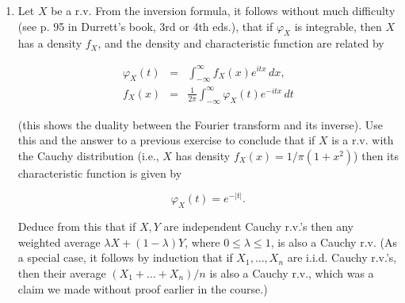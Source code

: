 \documentclass[11pt]{report}
\newcommand{\R}{\mathbb{R}}
\theoremstyle{plain}
\theoremstyle{definition}
\begin{document}
\begin{enumerate}[label=\arabic*.]
$\textbf{(b)}$ Let $X$ be a uniform r.v. in $(0,1)$,
and let $Y_1, Y_2, \ldots$ be the (random) bits in
its binary expansion, i.e. each $Y_n$ is either 0 or
1, and the equation

\begin{equation*}
\tag{39}\label{eq:binaryexp}
X = \sum_{n=1}^\infty \frac{Y_n}{2^n}
\end{equation*}

holds. Show that $Y_1, Y_2, \ldots$ are i.i.d.
unbiased coin tosses (i.e., taking values $0,1$ with
probabilities $1/2,1/2$).

$\textbf{(c)}$ Compute the characteristic function
$\varphi_Z$ of $Z=2X-1$ (which is uniform in
$(-1,1)$). Use (\ref{eq:binaryexp}) to represent this in
terms of the characteristic functions of the $Y_n$'s
(note that the series (\ref{eq:binaryexp}) converges
absolutely, so here there is no need to worry about
almost sure convergence). Deduce the infinite product
identity

\begin{equation*}
\tag{40}\label{eq:infproduct}
\frac{\sin(t)}{t} = \prod_{n=1}^\infty \cos\left(\frac{t}{2^n} \right), \qquad (t\in \R).
\end{equation*}

$\textbf{(d)}$ Substitute $t=\pi/2$ in
(\ref{eq:infproduct}) to get the identity

\[
\frac{2}{\pi} = \frac{\sqrt{2}}{2}\cdot \frac{\sqrt{2+\sqrt{2}}}{2} \cdot \frac{\sqrt{2+\sqrt{2+\sqrt{2}}}}{2} \cdot \ldots
\]

\item Let $X$ be a r.v. From the inversion formula, it
follows without much difficulty (see p. 95 in
Durrett's book, 3rd or 4th eds.), that if $\varphi_X$
is integrable, then $X$ has a density $f_X$, and the
density and characteristic function are related by

\begin{eqnarray*} \varphi_X(t) &=& \int_{-\infty}^\infty f_X(x) e^{itx}\,dx,  \\
f_X(x) &=& \frac{1}{2\pi} \int_{-\infty}^\infty \varphi_X(t) e^{-itx}\,dt
\end{eqnarray*}

(this shows the duality between the Fourier
transform and its inverse). Use this and the answer to
a previous exercise to conclude that if $X$ is a r.v.
with the Cauchy distribution (i.e., $X$ has density
$f_X(x)=1/\pi(1+x^2)$) then its characteristic
function is given by

\[
\varphi_X(t) = e^{-|t|}.
\]

Deduce from this that if $X,Y$ are independent
Cauchy r.v.'s then any weighted average
$\lambda X+(1-\lambda)Y$, where $0\le \lambda\le 1$,
is also a Cauchy r.v. (As a special case, it follows
by induction that if $X_1,\ldots,X_n$ are i.i.d.
Cauchy r.v.'s, then their average $(X_1+\ldots+X_n)/n$
is also a Cauchy r.v., which was a claim we made
without proof earlier in the course.)
\end{enumerate}
\end{document}
